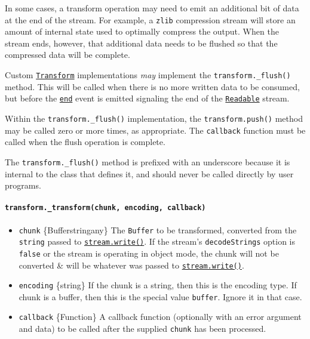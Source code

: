 In some cases, a transform operation may need to emit an additional bit
of data at the end of the stream. For example, a \texttt{zlib}
compression stream will store an amount of internal state used to
optimally compress the output. When the stream ends, however, that
additional data needs to be flushed so that the compressed data will be
complete.

Custom \hyperref[class-streamtransform]{\texttt{Transform}}
implementations \emph{may} implement the \texttt{transform.\_flush()}
method. This will be called when there is no more written data to be
consumed, but before the
\hyperref[event-end]{\texttt{\textquotesingle{}end\textquotesingle{}}}
event is emitted signaling the end of the
\hyperref[class-streamreadable]{\texttt{Readable}} stream.

Within the \texttt{transform.\_flush()} implementation, the
\texttt{transform.push()} method may be called zero or more times, as
appropriate. The \texttt{callback} function must be called when the
flush operation is complete.

The \texttt{transform.\_flush()} method is prefixed with an underscore
because it is internal to the class that defines it, and should never be
called directly by user programs.

\paragraph{\texorpdfstring{\texttt{transform.\_transform(chunk,\ encoding,\ callback)}}{transform.\_transform(chunk, encoding, callback)}}\label{transform._transformchunk-encoding-callback}

\begin{itemize}
\tightlist
\item
  \texttt{chunk} \{Buffer\textbar string\textbar any\} The
  \texttt{Buffer} to be transformed, converted from the \texttt{string}
  passed to
  \hyperref[writablewritechunk-encoding-callback]{\texttt{stream.write()}}.
  If the stream's \texttt{decodeStrings} option is \texttt{false} or the
  stream is operating in object mode, the chunk will not be converted \&
  will be whatever was passed to
  \hyperref[writablewritechunk-encoding-callback]{\texttt{stream.write()}}.
\item
  \texttt{encoding} \{string\} If the chunk is a string, then this is
  the encoding type. If chunk is a buffer, then this is the special
  value \texttt{\textquotesingle{}buffer\textquotesingle{}}. Ignore it
  in that case.
\item
  \texttt{callback} \{Function\} A callback function (optionally with an
  error argument and data) to be called after the supplied
  \texttt{chunk} has been processed.
\end{itemize}

